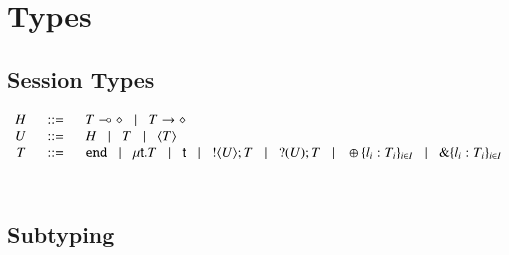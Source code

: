 \section{Types}

\subsection{Session Types}

\[
	\begin{array}{rcl}
		H &\;\;::=\;\;&	T \multimap \diamond \;\;\;|\;\;\; T \rightarrow \diamond \\
		U &\;\;::=\;\;&	H \;\;\;|\;\;\; T \;\;\;|\;\;\; \langle T \rangle \\
		T &\;\;::=\;\;&	\mathtt{end} \;\;\;|\;\;\; \mu\mathsf{t}.T \;\;\;|\;\;\; \mathsf{t} \;\;\;|\;\;\; ! \langle U \rangle ; T \;\;\;|\;\;\; ? (U) ; T
		\;\;\;|\;\;\;		\oplus \{l_i:T_i\}_{i \in I} \;\;\;|\;\;\; \& \{l_i:T_i\}_{i \in I}
	\end{array}
\]\


\subsection{Subtyping}



